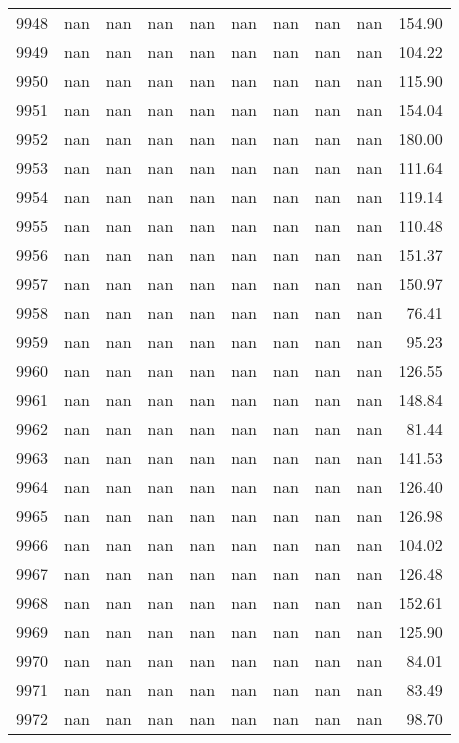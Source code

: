 \begin{tabular}{lrrrrrrrrr}
9948 & nan & nan & nan & nan & nan & nan & nan & nan & 154.90 \\
9949 & nan & nan & nan & nan & nan & nan & nan & nan & 104.22 \\
9950 & nan & nan & nan & nan & nan & nan & nan & nan & 115.90 \\
9951 & nan & nan & nan & nan & nan & nan & nan & nan & 154.04 \\
9952 & nan & nan & nan & nan & nan & nan & nan & nan & 180.00 \\
9953 & nan & nan & nan & nan & nan & nan & nan & nan & 111.64 \\
9954 & nan & nan & nan & nan & nan & nan & nan & nan & 119.14 \\
9955 & nan & nan & nan & nan & nan & nan & nan & nan & 110.48 \\
9956 & nan & nan & nan & nan & nan & nan & nan & nan & 151.37 \\
9957 & nan & nan & nan & nan & nan & nan & nan & nan & 150.97 \\
9958 & nan & nan & nan & nan & nan & nan & nan & nan & 76.41 \\
9959 & nan & nan & nan & nan & nan & nan & nan & nan & 95.23 \\
9960 & nan & nan & nan & nan & nan & nan & nan & nan & 126.55 \\
9961 & nan & nan & nan & nan & nan & nan & nan & nan & 148.84 \\
9962 & nan & nan & nan & nan & nan & nan & nan & nan & 81.44 \\
9963 & nan & nan & nan & nan & nan & nan & nan & nan & 141.53 \\
9964 & nan & nan & nan & nan & nan & nan & nan & nan & 126.40 \\
9965 & nan & nan & nan & nan & nan & nan & nan & nan & 126.98 \\
9966 & nan & nan & nan & nan & nan & nan & nan & nan & 104.02 \\
9967 & nan & nan & nan & nan & nan & nan & nan & nan & 126.48 \\
9968 & nan & nan & nan & nan & nan & nan & nan & nan & 152.61 \\
9969 & nan & nan & nan & nan & nan & nan & nan & nan & 125.90 \\
9970 & nan & nan & nan & nan & nan & nan & nan & nan & 84.01 \\
9971 & nan & nan & nan & nan & nan & nan & nan & nan & 83.49 \\
9972 & nan & nan & nan & nan & nan & nan & nan & nan & 98.70 \\

\end{tabular}
